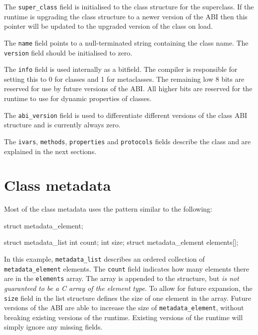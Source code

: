 \documentclass[a4paper]{report}
\newcommand{\ccode}[1]{\lstinline[language={C}]{#1}}
\newcommand{\inccode}[4]{
{
	 }}
	]{../#1}
}
}
\begin{document}
The \ccode{super_class} field is initialised to the class structure for the superclass.
If the runtime is upgrading the class structure to a newer version of the ABI then this pointer will be updated to the upgraded version of the class on load.

The \ccode{name} field points to a null-terminated string containing the class name.
The \ccode{version} field should be initialised to zero.

The \ccode{info} field is used internally as a bitfield.
The compiler is responsible for setting this to 0 for classes and 1 for metaclasses.
The remaining low 8 bits are reserved for use by future versions of the ABI.
All higher bits are reserved for the runtime to use for dynamic properties of classes.

The \ccode{abi_version} field is used to differentiate different versions of the class ABI structure and is currently always zero.

The \ccode{ivars}, \ccode{methods}, \ccode{properties} and \ccode{protocols} fields describe the class and are explained in the next sections.

\inccode{class.h}{class}{objc_class}{The class structure.}

\section{Class metadata}
\label{sec:metadata}

Most of the class metadata uses the pattern similar to the following:

\begin{codesnippet}
struct metadata_element;

struct metadata_list
{
	int count;
	int size;
	struct metadata_element elements[];
}
\end{codesnippet}

In this example, \ccode{metadata_list} describes an ordered collection of \ccode{metadata_element} elements.
The \ccode{count} field indicates how many elements there are in the \ccode{elements} array.
The array is appended to the structure, but \textit{is not guaranteed to be a C array of the element type}.
To allow for future expansion, the \ccode{size} field in the list structure defines the size of one element in the array.
Future versions of the ABI are able to increase the size of \ccode{metadata_element}, without breaking existing versions of the runtime.
Existing versions of the runtime will simply ignore any missing fields.
\end{document}
